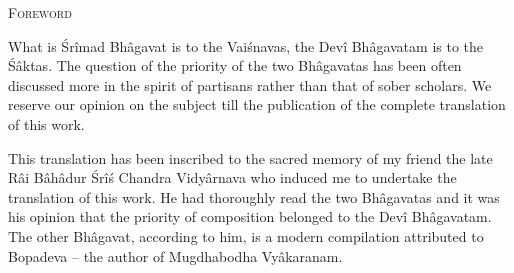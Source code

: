 ﻿\thispagestyle{plain}
\begin{center}
{\scshape\large Foreword}
\end{center}

What is \'Sr\^imad Bh\^agavat is to the Vai\'snavas, the Dev\^i Bh\^agavatam is to the \'S\^aktas. The question of the priority of the two Bh\^agavatas has been often discussed more in the spirit of partisans rather than that of sober scholars. We reserve our opinion on the subject till the publication of the complete translation of this work.

This translation has been inscribed to the sacred memory of my friend the late R\^ai B\^ah\^adur \'Sr\^i\'s Chandra Vidy\^arnava who induced me to undertake the translation of this work. He had thoroughly read the two Bh\^agavatas and it was his opinion that the priority of composition belonged to the Dev\^i Bh\^agavatam. The other Bh\^agavat, according to him, is a modern compilation attributed to Bopadeva – the author of Mugdhabodha Vy\^akaranam.